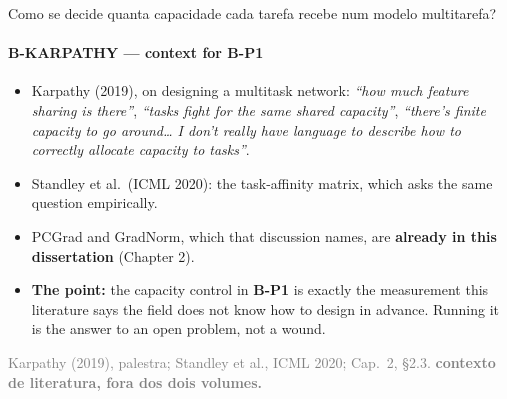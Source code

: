 \documentclass{beamer}
\begin{document}
\begin{frame}[noframenumbering]{Como se decide quanta capacidade cada tarefa recebe num modelo multitarefa?}
    \framesubtitle{B-KARPATHY --- context for B-P1}
    \hypertarget{bkarpathy}{}
    \small
    \begin{itemize}\setlength{\itemsep}{0pt}\setlength{\parskip}{0pt}
        \item Karpathy (2019), on designing a multitask network: \textit{``how much feature sharing is there''}, \textit{``tasks fight for the same shared capacity''}, \textit{``there's finite capacity to go around\ldots{} I don't really have language to describe how to correctly allocate capacity to tasks''}.
        \item Standley et al.\ (ICML 2020): the task-affinity matrix, which asks the same question empirically.
        \item PCGrad and GradNorm, which that discussion names, are \textbf{already in this dissertation} (Chapter 2).
        \item \textbf{The point:} the capacity control in \textbf{B-P1} is exactly the measurement this literature says the field does not know how to design in advance. Running it is the answer to an open problem, not a wound.
    \end{itemize}
    \vfill
    {\scriptsize
    \begin{minipage}[b]{0.775\linewidth}\raggedright\textcolor{gray}{Karpathy (2019), palestra; Standley et al., ICML 2020; Cap.~2, §2.3. \textbf{contexto de literatura, fora dos dois volumes.}}\end{minipage}\hfill
    \begin{minipage}[b]{0.20\linewidth}\raggedleft \hyperlink{bp1}{}\hyperlink{b0}{}\end{minipage}}
\end{frame}
\end{document}
